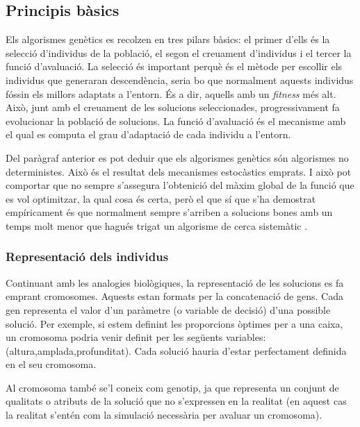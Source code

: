 \subsection{Principis bàsics}

Els algorismes genètics es recolzen en tres pilars bàsics: el primer d'ells és la selecció
d'individus de la població, el segon el creuament d'individus i el tercer la
funció d'avaluació. La selecció és important perquè és el mètode per escollir
els individus que generaran descendència, seria bo que normalment aquests
individus fóssin els millors adaptats a l'entorn. És a dir, aquells amb un
\emph{fitness} més alt.  Això, junt amb el creuament de les solucions
seleccionades, progressivament fa evolucionar la població de solucions. La
funció d'avaluació és el mecanisme amb el qual es computa el grau d'adaptació de
cada individu a l'entorn.

Del paràgraf anterior es pot deduir que els algorismes genètics són algorismes no deterministes.
Això és el resultat dels mecanismes estocàstics emprats. I això pot comportar
que no sempre s'assegura l'obtenició del màxim global de la funció que es vol
optimitzar, la qual cosa és certa, però el que sí que s'ha demostrat
empíricament és que normalment sempre s'arriben a solucions bones amb un temps
molt menor que hagués trigat un algorisme de cerca sistemàtic \cite{BBM93}. 

\subsubsection{Representació dels individus}

Continuant amb les analogies biològiques, la representació de les solucions es
fa emprant cromosomes. Aquests estan formats per la concatenació de gens. Cada
gen representa el valor d'un paràmetre (o variable de decisió) d'una possible
solució.  Per exemple, si estem definint les proporcions òptimes per a una
caixa, un cromosoma podria venir definit per les següents variables:
(altura,amplada,profunditat). Cada solució hauria d'estar perfectament definida
en el seu cromosoma.

Al cromosoma també se'l coneix com genotip, ja que representa un conjunt de
qualitats o atributs de la solució que no s'expressen en la realitat (en aquest
cas la realitat s'entén com la simulació necessària per avaluar un cromosoma).



